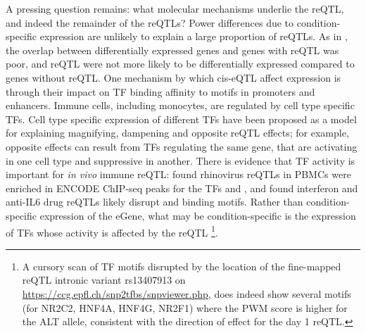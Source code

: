 
A pressing question remains: what molecular mechanisms underlie the  \gls{reQTL}, and indeed the remainder of the \glspl{reQTL}?
Power differences due to condition-specific expression are unlikely to explain a large proportion of reQTLs.
As in \autocite{kim-hellmuth2017GeneticRegulatoryEffects, davenport2018DiscoveringVivoCytokineeQTL}, the overlap between differentially expressed genes and genes with reQTL was poor,
and reQTL were not more likely to be differentially expressed compared to genes without reQTL.
One mechanism by which cis-eQTL affect expression is through their impact on \gls{TF} binding affinity to motifs in promoters and enhancers\autocite{pai2015GeneticMechanisticBasis}.
Immune cells, including monocytes, are regulated by cell type specific \glspl{TF}\autocite{choudhury2016IdentifyingCellTypeSpecific}.
Cell type specific expression of different \glspl{TF} have been proposed as a model for explaining magnifying, dampening and opposite reQTL effects;
for example, opposite effects can result from \glspl{TF} regulating the same gene, that are activating in one cell type and suppressive in another\autocite{fu2012UnravelingRegulatoryMechanisms}.
There is evidence that \gls{TF} activity is important for \textit{in vivo} immune reQTL:
\autocite{caliskan2015HostGeneticVariation} found rhinovirus reQTLs in \glspl{PBMC} were enriched in ENCODE ChIP-seq peaks for the \glspl{TF}  and ,
and \autocite{davenport2018DiscoveringVivoCytokineeQTL} found interferon and anti-IL6 drug reQTLs likely disrupt  and  binding motifs.
Rather than condition-specific expression of the eGene, what may be condition-specific is the expression of \glspl{TF} whose activity is affected by the reQTL%
\footnote{
    A cursory scan of \gls{TF} motifs disrupted by the location of the fine-mapped  reQTL intronic variant rs13407913 on \url{https://ccg.epfl.ch/snp2tfbs/snpviewer.php},
    does indeed show several motifs (for NR2C2, HNF4A, HNF4G, NR2F1)
    where the PWM score is higher for the ALT allele, 
    consistent with the direction of effect for the day 1 reQTL.
}.

